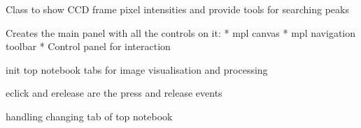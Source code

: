 \documentclass[letterpaper,10pt,english]{sphinxmanual}
\begin{document}
\begin{fulllineitems}
\label{\detokenize{PeakSearchGUI:LaueTools.GUI.PeakSearchGUI.MainPeakSearchFrame}}
Class to show CCD frame pixel intensities
and provide tools for searching peaks

\begin{fulllineitems}
\label{\detokenize{PeakSearchGUI:LaueTools.GUI.PeakSearchGUI.MainPeakSearchFrame.create_main_panel}}
Creates the main panel with all the controls on it:
* mpl canvas
* mpl navigation toolbar
* Control panel for interaction

\end{fulllineitems}


\begin{fulllineitems}
\label{\detokenize{PeakSearchGUI:LaueTools.GUI.PeakSearchGUI.MainPeakSearchFrame.toplayout2}}
init top notebook tabs for image visualisation and processing

\end{fulllineitems}


\begin{fulllineitems}
\label{\detokenize{PeakSearchGUI:LaueTools.GUI.PeakSearchGUI.MainPeakSearchFrame.line_select_callback}}
eclick and erelease are the press and release events

\end{fulllineitems}


\begin{fulllineitems}
\label{\detokenize{PeakSearchGUI:LaueTools.GUI.PeakSearchGUI.MainPeakSearchFrame.OnTabChange_nb0}}
handling changing tab of top notebook


\end{fulllineitems}
\end{fulllineitems}
\end{document}
